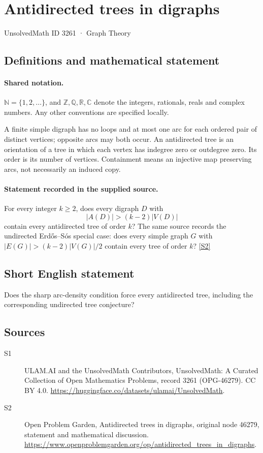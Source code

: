 \documentclass[11pt]{article}
\newcommand{\sref}[2]{\hyperlink{source:#1:#2}{[S#2]}}
\begin{document}
\setcounter{section}{3260}
\section{Antidirected trees in digraphs}\label{3261}
{\small\sffamily UnsolvedMath ID 3261 · Graph Theory}
\subsection{Definitions and mathematical statement}

\paragraph{Shared notation.}$\mathbb N=\{1,2,\ldots\}$, and $\mathbb Z,\mathbb Q,\mathbb R,\mathbb C$ denote the integers, rationals, reals and complex numbers. Any other conventions are specified locally.


A finite simple digraph has no loops and at most one arc for each ordered pair of distinct vertices; opposite arcs may both occur. An antidirected tree is an orientation of a tree in which each vertex has indegree zero or outdegree zero. Its order is its number of vertices. Containment means an injective map preserving arcs, not necessarily an induced copy.
\paragraph{Statement recorded in the supplied source.}
For every integer $k\ge2$, does every digraph $D$ with \[|A(D)|>(k-2)|V(D)|\] contain every antidirected tree of order $k$? The same source records the undirected Erd\H{o}s--S\'os special case: does every simple graph $G$ with $|E(G)|>(k-2)|V(G)|/2$ contain every tree of order $k$? \sref{3261}{2}
\subsection{Short English statement}
Does the sharp arc-density condition force every antidirected tree, including the corresponding undirected tree conjecture?
\subsection{Sources}
\begin{description}
\item[\hypertarget{source:3261:1}{S1}] ULAM.AI and the UnsolvedMath Contributors, UnsolvedMath: A Curated Collection of Open Mathematics Problems, record 3261 (OPG-46279). CC BY 4.0. \url{https://huggingface.co/datasets/ulamai/UnsolvedMath}.
\item[\hypertarget{source:3261:2}{S2}] Open Problem Garden, Antidirected trees in digraphs, original node 46279, statement and mathematical discussion. \url{https://www.openproblemgarden.org/op/antidirected_trees_in_digraphs}.
\end{description}
\label{end:3261}
\end{document}
